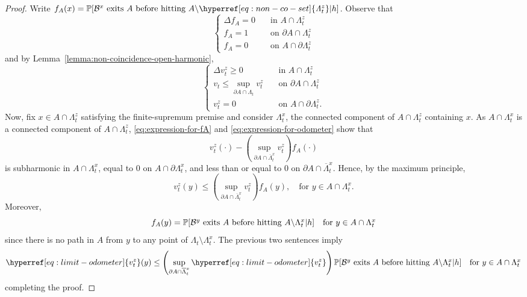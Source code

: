\documentclass[12pt]{amsart}
\numberwithin{equation}{section}
\newcommand{\cluster}[2]{\hyperref[eq:non-co-set]{\mathit{\Lambda}^{#1}_{#2}}}
\newcommand{\odometer}[2]{\hyperref[eq:limit-odometer]{v^{#1}_{#2}}}
\begin{document}
	\begin{proof}
		Write $f_A(x) =\P[\mbox{$\mathcal{B}^x$ exits  $A$ before hitting  $A \backslash {\cluster{z}{t}}$} | h]$. Observe that
		\begin{equation} \label{eq:expression-for-fA}
		\begin{cases}
		\Delta f_A = 0 \quad &\mbox{in $A \cap {\cluster{z}{t}}$} \\
		f_A = 1 \quad &\mbox{on $\partial A \cap {\cluster{z}{t}}$} \\
		f_A = 0 \quad &\mbox{on $A \cap \partial {\cluster{z}{t}}$}
		\end{cases}
		\end{equation}
		and by Lemma~\ref{lemma:non-coincidence-open-harmonic},
		\begin{equation}\label{eq:expression-for-odometer}
		\begin{cases}
		\Delta \odometer{z}{t} \geq 0 \quad &\mbox{in $A \cap {\cluster{z}{t}}$} \\
		\odometer{}{t} \leq \sup_{\partial A \cap {\cluster{}{t}}} \odometer{z}{t} \quad &\mbox{on $\partial A \cap {\cluster{z}{t}}$} \\
		\odometer{z}{t} = 0 \quad &\mbox{on $A \cap \partial {\cluster{z}{t}}$}.
		\end{cases}
		\end{equation}
		Now, fix $x \in A \cap {\cluster{z}{t}}$ satisfying the finite-supremum premise and consider $\Lambda^x_t$, the connected component of $A \cap {\cluster{z}{t}}$ containing $x$.  
		As $A \cap \Lambda^x_t$ is a connected component of $A \cap {\cluster{z}{t}}$, \eqref{eq:expression-for-fA} and \eqref{eq:expression-for-odometer}
		show that 
		\[
		\odometer{z}{t}(\cdot) - \left(\sup_{\partial A \cap \overline \Lambda^x_t} \odometer{z}{t}\right) f_A(\cdot)
		\]
		is subharmonic in $A \cap \Lambda^x_t$, equal to 0 on $A \cap \partial \Lambda^x_t$, and less than or 
		equal to 0 on $\partial A \cap \overline \Lambda^x_t$. 
		Hence, by the maximum principle,
		\[
		\odometer{z}{t}(y) \leq  \left(\sup_{\partial A \cap \overline \Lambda^x_t} \odometer{z}{t}\right) f_A(y) , \quad \mbox{for $y \in A \cap \Lambda^x_t$} .
		\]
		Moreover, 
		\[
		f_A(y) = \P[\mbox{$\mathcal{B}^y$ exits  $A$ before hitting  $A \backslash \Lambda^x_t$} | h ] \quad \mbox{for $y \in A \cap \Lambda^x_t$}
		\]
		since there is no path in $A$ from $y$ to any point of $\Lambda_t\setminus \Lambda_t^x$.
		The previous two sentences imply  
		\[
		\odometer{z}{t}(y) \leq  \left(\sup_{\partial A \cap \overline \Lambda^x_t} \odometer{z}{t}\right) \P[\mbox{$\mathcal{B}^y$ exits  $A$ before hitting  $A \backslash \Lambda^x_t$} |h ]  \quad  \mbox{for $y \in A \cap \Lambda^x_t$}
		\]
		completing the proof. 	
	\end{proof}
	
\end{document}
